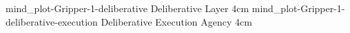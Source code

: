 {\experimentcausegroupplots{\dataappendixmaxtime}
                           {\dataappendixexperimentonemaxtime}
                           {\dataappendixexperimenttwomaxtime}
                           {\dataappendixexperimentthreemaxtime}
                           {\dataappendixexperimentonename}
                           {\dataappendixexperimenttwoname}
                           {\dataappendixexperimentthreename}
                           {\dataappendixexperimentoneprettyname}
                           {\dataappendixexperimenttwoprettyname}
                           \experimentcausegroupplotscontinued{\dataappendixexperimentthreeprettyname}
                                                              {mind_plot-Gripper-1-deliberative}
                                                              {Deliberative Layer}
                                                              {\experimentdatacommontablereference}
                                                              {4cm}
{\experimentcausegroupplots{\dataappendixmaxtime}
                           {\dataappendixexperimentonemaxtime}
                           {\dataappendixexperimenttwomaxtime}
                           {\dataappendixexperimentthreemaxtime}
                           {\dataappendixexperimentonename}
                           {\dataappendixexperimenttwoname}
                           {\dataappendixexperimentthreename}
                           {\dataappendixexperimentoneprettyname}
                           {\dataappendixexperimenttwoprettyname}
                           \experimentcausegroupplotscontinued{\dataappendixexperimentthreeprettyname}
                                                              {mind_plot-Gripper-1-deliberative-execution}
                                                              {Deliberative Execution Agency}
                                                              {\experimentdatacommontablereference}
                                                              {4cm}}
{\experimentcausegroupplots{\dataappendixmaxtime}
                           {\dataappendixexperimentonemaxtime}
                           {\dataappendixexperimenttwomaxtime}
                           {\dataappendixexperimentthreemaxtime}
                           {\dataappendixexperimentonename}
                           {\dataappendixexperimenttwoname}
                           {\dataappendixexperimentthreename}
                           {\dataappendixexperimentoneprettyname}
                           {\dataappendixexperimenttwoprettyname}
}}
